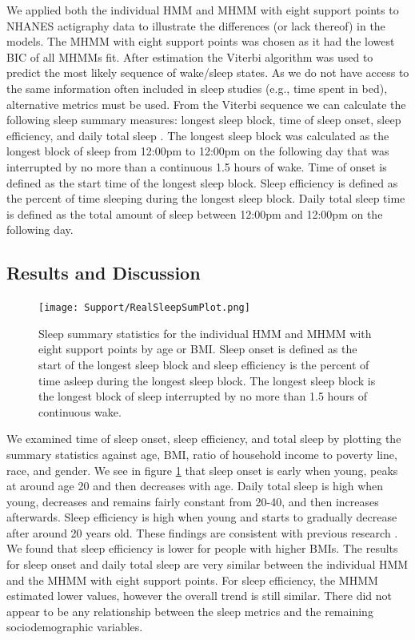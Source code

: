 \documentclass[num-refs]{wiley-article}
\begin{document}
We applied both the individual HMM and MHMM with eight support points to NHANES actigraphy data to illustrate the differences (or lack thereof) in the models. The MHMM with eight support points was chosen as it had the lowest BIC of all MHMMs fit. After estimation the Viterbi algorithm was used to predict the most likely sequence of wake/sleep states. As we do not have access to the same information often included in sleep studies (e.g., time spent in bed), alternative metrics must be used. From the Viterbi sequence we can calculate the following sleep summary measures: longest sleep block, time of sleep onset, sleep efficiency, and daily total sleep \cite{Su2022}. The longest sleep block was calculated as the longest block of sleep from 12:00pm to 12:00pm on the following day that was interrupted by no more than a continuous 1.5 hours of wake. Time of onset is defined as the start time of the longest sleep block. Sleep efficiency is defined as the percent of time sleeping during the longest sleep block. Daily total sleep time is defined as the total amount of sleep between 12:00pm and 12:00pm on the following day.

\subsection{Results and Discussion}

\begin{figure}
    \texttt{[image: Support/RealSleepSumPlot.png]}
    \centering
    \caption{Sleep summary statistics for the individual HMM and MHMM with eight support points by age or BMI. Sleep onset is defined as the start of the longest sleep block and sleep efficiency is the percent of time asleep during the longest sleep block. The longest sleep block is the longest block of sleep interrupted by no more than 1.5 hours of continuous wake.}
    \label{SleepSum}
\end{figure}

We examined time of sleep onset, sleep efficiency, and total sleep by plotting the summary statistics against age, BMI, ratio of household income to poverty line, race, and gender. We see in figure \ref{SleepSum} that sleep onset is early when young, peaks at around age 20 and then decreases with age. Daily total sleep is high when young, decreases and remains fairly constant from 20-40, and then increases afterwards. Sleep efficiency is high when young and starts to gradually decrease after around 20 years old. These findings are consistent with previous research \cite{Su2022}. We found that sleep efficiency is lower for people with higher BMIs. The results for sleep onset and daily total sleep are very similar between the individual HMM and the MHMM with eight support points. For sleep efficiency, the MHMM estimated lower values, however the overall trend is still similar. There did not appear to be any relationship between the sleep metrics and the remaining sociodemographic variables. 
\end{document}
